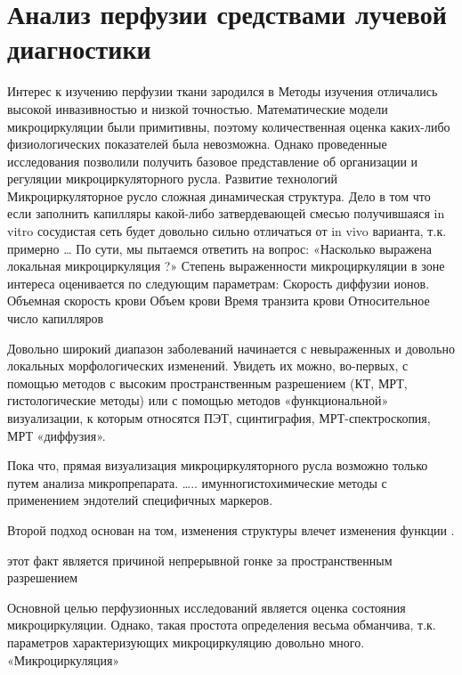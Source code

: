 \section{Анализ перфузии средствами лучевой диагностики} 
\label{perfusion_radiology}
Интерес к изучению перфузии ткани зародился в %
Методы изучения отличались высокой инвазивностью и низкой точностью. Математические модели микроциркуляции были примитивны, поэтому количественная оценка каких-либо физиологических показателей была невозможна. Однако проведенные исследования позволили получить базовое представление об организации и регуляции микроциркуляторного русла. 
Развитие технологий 
Микроциркуляторное русло сложная динамическая структура. Дело в том что если заполнить капилляры какой-либо затвердевающей смесью получившаяся in vitro сосудистая сеть будет довольно сильно отличаться от in vivo варианта, т.к. примерно …%
По сути, мы пытаемся ответить на вопрос: «Насколько выражена локальная микроциркуляция ?»
Степень выраженности микроциркуляции в зоне интереса оценивается по следующим параметрам:
Скорость диффузии ионов.
Объемная скорость крови
Объем крови
Время транзита крови
Относительное число капилляров


Довольно широкий диапазон заболеваний начинается с невыраженных и довольно локальных морфологических изменений. Увидеть их можно, во-первых, с помощью методов с высоким пространственным разрешением (КТ, МРТ, гистологические методы) или с помощью методов «функциональной» визуализации, к которым относятся ПЭТ, сцинтиграфия, МРТ-спектроскопия, МРТ «диффузия». 

Пока что, прямая визуализация микроциркуляторного русла возможно только путем анализа микропрепарата. ….. имунногистохимические методы с  применением эндотелий специфичных маркеров.


Второй подход основан на том, изменения структуры влечет изменения функции . 

этот факт является причиной непрерывной гонке за пространственным разрешением 


Основной целью перфузионных исследований является оценка состояния микроциркуляции. Однако, такая простота определения весьма обманчива, т.к. параметров характеризующих микроциркуляцию довольно много. «Микроциркуляция» 
